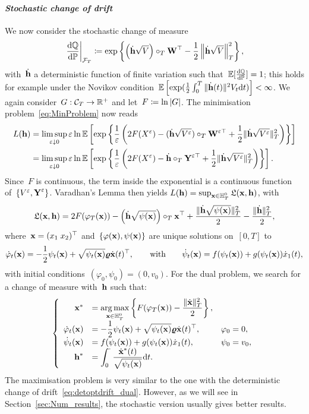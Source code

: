 \paragraph{\textit{Stochastic change of drift}}
We now consider the stochastic change of measure 
$$
\left.\frac{\D\QQ}{\D\PP}\right|_{\Ff_T} \defEqual \exp\left\{\left(\dot{\hh}\sqrt{V}\right)\cT \Wf^\top - \frac{1}{2}\left\|\dot{\hh}\sqrt{V}\right\|_{T}^2\right\},
$$
with~$\dot{\hh}$ a deterministic function of finite variation such that~$\EE[\frac{\D\QQ}{\D \PP}]=1$;
this holds for example under the Novikov condition~$\EE\left [\exp(\frac{1}{2}\int_0^T \|\dot{\hh}(t)\|^2 V_t \D t)\right ]<\infty$. 
We again consider~$G:\Cc_T\rightarrow\nobreak\RR^+$ and let~$F\defEqual\ln|G|$. 
The minimisation problem~\eqref{eq:MinProblem} now reads
\begin{align*}
L(\hh) &=\limsup\limits_{\eps\downarrow 0}\eps
\ln\EE\left[\exp\left\{\frac{1}{\eps}\left(2F(X^{\eps}) - (\dot{\hh}\sqrt{V^{\eps}}) \cT \Wf^{\eps\top} + \frac{1}{2}\|\dot{\hh}\sqrt{V^\eps}\|_{T}^2\right)\right\}\right]\\
&= \limsup\limits_{\eps\downarrow 0}\eps\ln\EE\left[\exp\left\{\frac{1}{\eps}\left(2F(X^{\eps}) - \dot{\hh} \cT \Yf^{\eps\top} + \frac{1}{2}\|\dot{\hh}\sqrt{V^\eps}\|_{T}^2\right)\right\}\right].
\end{align*}
Since~$F$ is continuous, the term inside the exponential is a continuous function of~$\{V^{\eps},\Yf^{\eps}\}$. 
Varadhan's Lemma then yields
$L(\hh) = \sup_{\xx\in \HH_T^0}\Lf(\xx,\hh)$,
with 
$$
\Lf(\xx,\hh) = 2F(\varphi_T(\xx)) - \left(\dot{\hh}\sqrt{\psi(\xx)}\right)\cT \xx^\top + \frac{\|\dot{\hh}\sqrt{\psi(\xx)}\|_{T}^2}{2} - \frac{\|\dot{\hh}\|_{T}^2}{2},
$$
where~$\xx = (x_1 \; x_2)^\top$ and~$\{\varphi(\xx),\psi(\xx)\}$ are unique solutions on~$[0,T]$ to
$$
\dot{\varphi}_t(\xx) = -\frac{1}{2}\psi_t(\xx) + \sqrt{\psi_t(\xx)} \vrho\dot{\xx}(t)^\top,
\qquad\text{with}\qquad
\dot{\psi}_t(\xx) = f(\psi_t(\xx)) + g(\psi_t(\xx)) \dot{x}_1(t),
$$
with initial conditions~$(\varphi_0,\psi_0) = (0,v_0)$. 
For  the dual problem, we search for a change of measure with~$\hh$ such that:
\begin{equation}\label{eq:detoptstochdrift_dual}
\left\{
\begin{array}{rll}
\xx^* & = \displaystyle \argmax\limits_{\xx\in \HH_T^0} 
\left\{F(\varphi_T(\xx)) - \frac{\|\dot{\xx}\|_{T}^2}{2}\right\},\\
\dot{\varphi}_t(\xx) & = \displaystyle -\frac{1}{2}\psi_t(\xx) + \sqrt{\psi_t(\xx)} \vrho \dot{\xx}(t)^\top, & \varphi_0 = 0,\\
\dot{\psi}_t(\xx) & = \displaystyle f(\psi_t(\xx)) + g(\psi_t(\xx)) \dot{x}_1(t), & \psi_0 = v_0,\\
\hh^* & = \displaystyle \int_{0}^{\cdot}\frac{\dot{\xx}^*(t)}{\sqrt{\psi_t(\xx)}}\D t.
\end{array}
\right.
\end{equation}
The maximisation problem is very similar to the one with the deterministic change of drift~\eqref{eq:detoptdrift_dual}. 
However, as we will see in Section~\ref{sec:Num_results}, the stochastic version usually gives better results.

